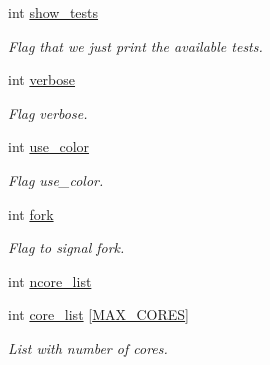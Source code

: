 \begin{DoxyCompactItemize}
\item 
\mbox{\label{structprogram__arguments_a373cc9d546fdd5ca2c75e42300caf2e6}} 
int \hyperlink{structprogram__arguments_a373cc9d546fdd5ca2c75e42300caf2e6}{show\+\_\+tests}
\begin{DoxyCompactList}\small\item\em Flag that we just print the available tests. \end{DoxyCompactList}\item 
\mbox{\label{structprogram__arguments_ab075ba9c1c9d3b650c7490717ed6391e}} 
int \hyperlink{structprogram__arguments_ab075ba9c1c9d3b650c7490717ed6391e}{verbose}
\begin{DoxyCompactList}\small\item\em Flag verbose. \end{DoxyCompactList}\item 
\mbox{\label{structprogram__arguments_ae952a1ee415137013201280b500796c7}} 
int \hyperlink{structprogram__arguments_ae952a1ee415137013201280b500796c7}{use\+\_\+color}
\begin{DoxyCompactList}\small\item\em Flag use\+\_\+color. \end{DoxyCompactList}\item 
\mbox{\label{structprogram__arguments_ac8d013f1348ee6c7287fd974561b4f47}} 
int \hyperlink{structprogram__arguments_ac8d013f1348ee6c7287fd974561b4f47}{fork}
\begin{DoxyCompactList}\small\item\em Flag to signal fork. \end{DoxyCompactList}\item 
int \hyperlink{structprogram__arguments_ab9717e16b92f14aa8c54dbf4a2d2b7b1}{ncore\+\_\+list}
\item 
\mbox{\label{structprogram__arguments_ad063b1ce13702392eb2a64792488d505}} 
int \hyperlink{structprogram__arguments_ad063b1ce13702392eb2a64792488d505}{core\+\_\+list} \mbox{[}\hyperlink{bios_8h_a009855593b59738d24dbfc236edb3b14}{M\+A\+X\+\_\+\+C\+O\+R\+ES}\mbox{]}
\begin{DoxyCompactList}\small\item\em List with number of cores. \end{DoxyCompactList}\item 

\end{DoxyCompactItemize}
